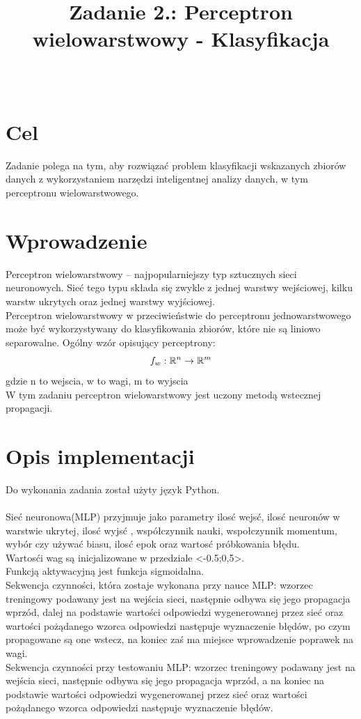 \documentclass{classrep}
\author{%
  \studentinfo[210139@edu.p.lodz.pl]{Krzysztof Barden}{210139}\\
  \studentinfo[210342@edu.p.lodz.pl]{Adam Troszczyński}{210342}%
}
\title{Zadanie 2.: Perceptron wielowarstwowy - Klasyfikacja}
\newcommand{\R}{\mathbb{R}}
\begin{document}
\maketitle
\thispagestyle{fancyplain}

\section{Cel}
{
Zadanie polega na tym, aby rozwiązać problem klasyfikacji 
wskazanych zbiorów danych z wykorzystaniem narzędzi inteligentnej
 analizy danych, w tym perceptronu wielowarstwowego.

}

\section{Wprowadzenie}
{
Perceptron wielowarstwowy – najpopularniejszy typ sztucznych 
sieci neuronowych. Sieć tego typu składa się zwykle z jednej warstwy
 wejściowej, kilku warstw ukrytych oraz jednej warstwy wyjściowej.\\
Perceptron wielowarstwowy w przeciwieństwie do perceptronu jednowarstwowego 
może być wykorzystywany do klasyfikowania zbiorów, które nie są liniowo separowalne.
Ogólny wzór opisujący perceptrony:
\begin{equation}
f_w : \R ^n \rightarrow \R ^m\\
\end{equation}
gdzie n to wejscia, w to wagi, m to wyjscia\\ 
W tym zadaniu perceptron wielowarstwowy jest uczony metodą wstecznej propagacji.}

\section{Opis implementacji}
{Do wykonania zadania został użyty język Python.\\\\
Sieć neuronowa(MLP) przyjmuje jako parametry ilosć wejsć, ilosć neuronów w warstwie ukrytej, ilosć wyjsć
, współczynnik nauki, wspołczynnik momentum, wybór czy używać biasu, ilosć epok oraz wartosć próbkowania błędu.\\
Wartosći wag są inicjalizowane w przedziale <-0.5;0,5>.\\
Funkcją aktywacyjną jest funkcja sigmoidalna.\\
Sekwencja czynności, która zostaje wykonana przy nauce MLP: wzorzec treningowy podawany jest na wejścia sieci, następnie odbywa się jego propagacja wprzód, dalej na podstawie wartości odpowiedzi wygenerowanej przez sieć oraz wartości pożądanego wzorca odpowiedzi następuje wyznaczenie błędów, po czym propagowane są one wstecz, na koniec zaś ma miejsce wprowadzenie poprawek na wagi.\\
Sekwencja czynności przy testowaniu MLP: wzorzec treningowy podawany jest na wejścia sieci, następnie odbywa się jego propagacja wprzód, a na koniec na podstawie wartości odpowiedzi wygenerowanej przez sieć oraz wartości pożądanego wzorca odpowiedzi następuje wyznaczenie błędów.
}
\end{document}
